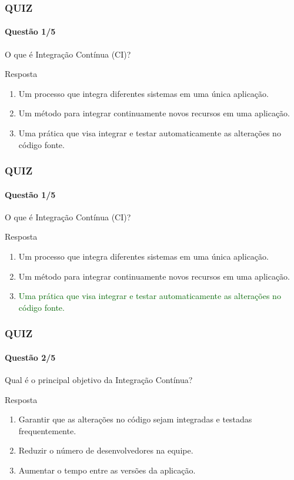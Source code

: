 \documentclass[
	9pt, %
	t, %
]{beamer}
\begin{document}
\begin{frame}
	\frametitle{QUIZ}
	\framesubtitle{Questão 1/5}

	{\Large O que é Integração Contínua (CI)?}

	\begin{exampleblock}{Resposta}
		\begin{enumerate}[a]
			\item Um processo que integra diferentes sistemas em uma única aplicação.
			\item Um método para integrar continuamente novos recursos em uma aplicação.
			\item Uma prática que visa integrar e testar automaticamente as alterações no código fonte.
		\end{enumerate}
	\end{exampleblock}

\end{frame}

\begin{frame}
	\frametitle{QUIZ}
	\framesubtitle{Questão 1/5}

	{\Large O que é Integração Contínua (CI)?}

	\begin{exampleblock}{Resposta}
		\begin{enumerate}[a]
			\item Um processo que integra diferentes sistemas em uma única aplicação.
			\item Um método para integrar continuamente novos recursos em uma aplicação.
			\item \textcolor{darkgreen}{Uma prática que visa integrar e testar automaticamente as alterações no código fonte.}
		\end{enumerate}
	\end{exampleblock}

\end{frame}

\begin{frame}
	\frametitle{QUIZ}
	\framesubtitle{Questão 2/5}

	{\Large Qual é o principal objetivo da Integração Contínua?}

	\begin{exampleblock}{Resposta}
		\begin{enumerate}[a]
			\item Garantir que as alterações no código sejam integradas e testadas frequentemente.
			\item Reduzir o número de desenvolvedores na equipe.
			\item Aumentar o tempo entre as versões da aplicação.
		\end{enumerate}
	\end{exampleblock}

\end{frame}
\end{document}
